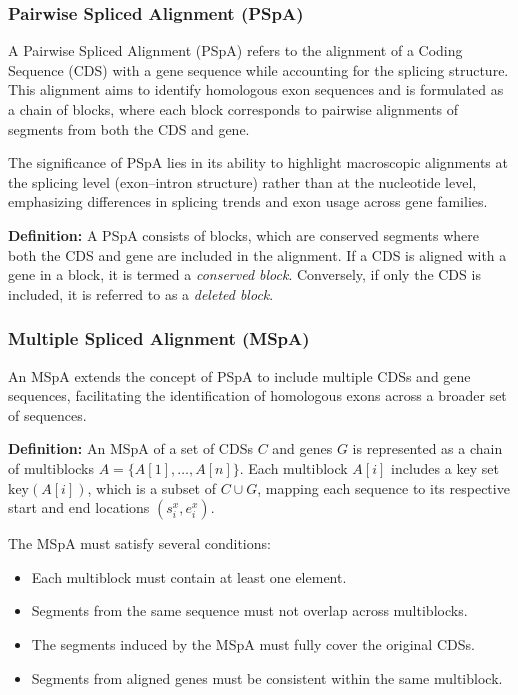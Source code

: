 

\subsubsection{Pairwise Spliced Alignment (PSpA)}

A Pairwise Spliced Alignment (PSpA) refers to the alignment of a Coding Sequence (CDS) with a gene sequence while accounting for the splicing structure. This alignment aims to identify homologous exon sequences and is formulated as a chain of blocks, where each block corresponds to pairwise alignments of segments from both the CDS and gene. 

The significance of PSpA lies in its ability to highlight macroscopic alignments at the splicing level (exon–intron structure) rather than at the nucleotide level, emphasizing differences in splicing trends and exon usage across gene families.

\textbf{Definition:} A PSpA consists of blocks, which are conserved segments where both the CDS and gene are included in the alignment. If a CDS is aligned with a gene in a block, it is termed a \textit{conserved block}. Conversely, if only the CDS is included, it is referred to as a \textit{deleted block}.

\subsubsection{Multiple Spliced Alignment (MSpA)}

An MSpA extends the concept of PSpA to include multiple CDSs and gene sequences, facilitating the identification of homologous exons across a broader set of sequences. 

\textbf{Definition:} An MSpA of a set of CDSs \( C \) and genes \( G \) is represented as a chain of multiblocks \( A = \{A[1], \ldots, A[n]\} \). Each multiblock \( A[i] \) includes a key set \( \text{key}(A[i]) \), which is a subset of \( C \cup G \), mapping each sequence to its respective start and end locations \( (s^x_i, e^x_i) \).

The MSpA must satisfy several conditions:
\begin{itemize}
    \item Each multiblock must contain at least one element.
    \item Segments from the same sequence must not overlap across multiblocks.
    \item The segments induced by the MSpA must fully cover the original CDSs.
    \item Segments from aligned genes must be consistent within the same multiblock.
\end{itemize}